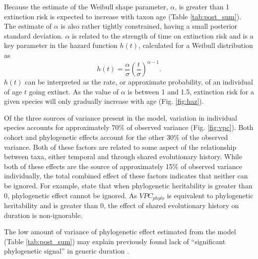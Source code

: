 \documentclass[12pt,letterpaper]{article}
\begin{document}
Because the estimate of the Weibull shape parameter, \(\alpha\), is greater than 1 extinction risk is expected to increase with taxon age (Table \ref{tab:post_sum}). The estimate of \(\alpha\) is also rather tightly constrained, having a small posterior standard deviation. \(\alpha\) is related to the strength of time on extinction risk and is a key parameter in the hazard function \(h(t)\), calculated for a Weibull distribution as
\begin{equation}
  h(t) = \frac{\alpha}{\sigma}\left(\frac{t}{\sigma}\right)^{\alpha - 1}.
\end{equation}
\(h(t)\) can be interpreted as the rate, or approximate probability, of an individual of age \(t\) going extinct. As the value of \(\alpha\) is between 1 and 1.5, extinction risk for a given species will only gradually increase with age (Fig. \ref{fig:haz}). 

Of the three sources of variance present in the model, variation in individual species accounts for approximately 70\% of observed variance (Fig. \ref{fig:vpc}). Both cohort and phylogenetic effects account for the other 30\% of the observed variance. Both of these factors are related to some aspect of the relationship between taxa, either temporal and through shared evolutionary history. While both of these effects are the source of approximately 15\% of observed variance individually, the total combined effect of these factors indicates that neither can be ignored. For example, \citet{Housworth2004} state that when phylogenetic heritability is greater than 0, phylogenetic effect cannot be ignored. As \(VPC_{phylo}\) is equivalent to phylogenetic heritability and is greater than 0, the effect of shared evolutionary history on duration is non-ignorable.

The low amount of variance of phylogenetic effect estimated from the model (Table \ref{tab:post_sum}) may explain previously found lack of ``significant phylogenetic signal'' in generic duration \citep{Tomiya2013}.



\end{document}
